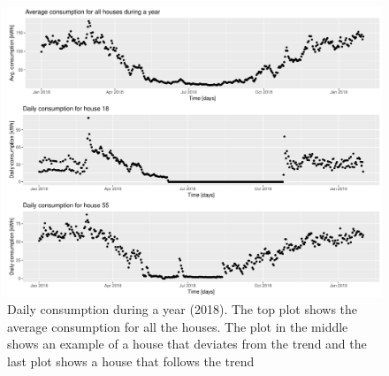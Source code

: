 \begin{figure}
    \centering
    \includegraphics[width=1.\textwidth]{../../../figures/daily_cons.pdf}
    \caption{Daily consumption during a year (2018). The top plot shows the average consumption for all the houses. The plot in the middle shows an example of a house that deviates from the trend and the last plot shows a house that follows the trend}
    \label{fig: daily_cons}
\end{figure}


